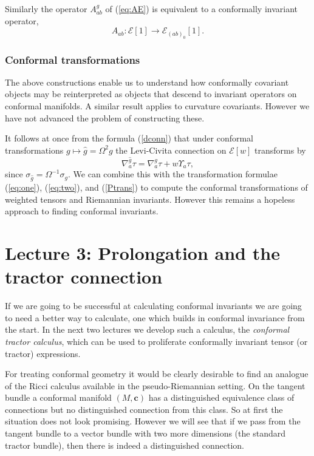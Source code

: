 \documentclass[a4paper,12pt]{amsart}
\def\Cal{\mathcal}
\newcommand{\cc}{\boldsymbol{c}}
\newcommand{\ce}{{\Cal E}}
\newcommand{\si}{\sigma}
\theoremstyle{remark}
\newcommand{\nn}[1]{(\ref{#1})}
\begin{document}
Similarly the operator $A^g_{ab}$ of \nn{eq:AE} is equivalent to a conformally invariant operator,
$$
A_{ab}:\ce[1] \to \ce_{(ab)_0}[1].
$$ 

\subsubsection{Conformal transformations}\label{ctagain}

The above constructions enable us to understand how conformally covariant
objects may be reinterpreted as objects that descend to invariant
operators on conformal manifolds. A similar result applies to
curvature covariants. However we have not advanced the problem of
constructing these.

It follows at once from the formula \nn{dconn} that under conformal
transformations $g\mapsto \widehat{g}=\Omega^2 g$ the Levi-Civita
connection on $\ce[w]$ transforms by
\begin{equation}\label{lct}
\nabla^{\widehat{g}}_a \tau= \nabla^g_a\tau + w\Upsilon_a \tau,
\end{equation}
since $\si_{\widehat{g}}=\Omega^{-1}\si_g$. We can combine this with
the transformation formulae \nn{eq:one}, \nn{eq:two}, and \nn{Ptrans}
to compute the conformal transformations of weighted tensors and
Riemannian invariants. However this remains a hopeless approach to finding
conformal invariants. 









\section{Lecture 3: Prolongation and the tractor connection}

If we are going to be successful at calculating conformal invariants we are going to need a better way to calculate, one which builds in conformal invariance from the start. In the next two lectures we develop such a calculus, the \emph{conformal tractor calculus}, which can be used to proliferate conformally invariant tensor (or tractor) expressions.

For treating conformal geometry it would be clearly desirable to find
an analogue of the Ricci calculus available in the pseudo-Riemannian
setting. On the tangent bundle a conformal manifold $(M,\cc)$ has a
distinguished equivalence class of connections but no distinguished
connection from this class. So at first the situation does not look
promising. However we will see that if we pass from the tangent bundle to a vector bundle with two more dimensions (the standard tractor bundle), then there is indeed a distinguished connection.
\end{document}
